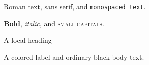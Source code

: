 \documentclass{article}
\begin{document}
Roman text, \textsf{sans serif}, and \texttt{monospaced text}.

\textbf{Bold}, \textit{italic}, and \textsc{small capitals}.

{\Large A local heading\par}
\textcolor{atelier}{A colored label} and ordinary black body text.
\end{document}
